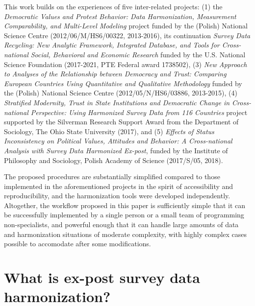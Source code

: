 \documentclass[12pt,]{article}
\begin{document}
This work builds on the experiences of five inter-related projects: (1) the \emph{Democratic Values and Protest Behavior: Data Harmonization, Measurement Comparability, and Multi-Level Modeling} project funded by the (Polish) National Science Centre (2012/06/M/HS6/00322, 2013-2016), its continuation \emph{Survey Data Recycling: New Analytic Framework, Integrated Database, and Tools for Cross-national Social, Behavioral and Economic Research} funded by the U.S. National Science Foundation (2017-2021, PTE Federal award 1738502), (3) \emph{New Approach to Analyses of the Relationship between Democracy and Trust: Comparing European Countries Using Quantitative and Qualitative Methodology} funded by the (Polish) National Science Centre (2012/05/N/HS6/03886, 2013-2015), (4) \emph{Stratified Modernity, Trust in State Institutions and Democratic Change in Cross-national Perspective: Using Harmonized Survey Data from 116 Countries} project supported by the Silverman Research Support Award from the Department of Sociology, The Ohio State University (2017), and (5) \emph{Effects of Status Inconsistency on Political Values, Attitudes and Behavior: A Cross-national Analysis with Survey Data Harmonized Ex-post}, funded by the Institute of Philosophy and Sociology, Polish Academy of Science (2017/S/05, 2018).

The proposed procedures are substantially simplified compared to those implemented in the aforementioned projects in the spirit of accessibility and reproducibility, and the harmonization tools were developed independently. Altogether, the workflow proposed in this paper is sufficiently simple that it can be successfully implemented by a single person or a small team of programming non-specialists, and powerful enough that it can handle large amounts of data and harmonization situations of moderate complexity, with highly complex cases possible to accomodate after some modifications.

\hypertarget{what-is-ex-post-survey-data-harmonization}{%
\section{What is ex-post survey data harmonization?}\label{what-is-ex-post-survey-data-harmonization}}
\end{document}
